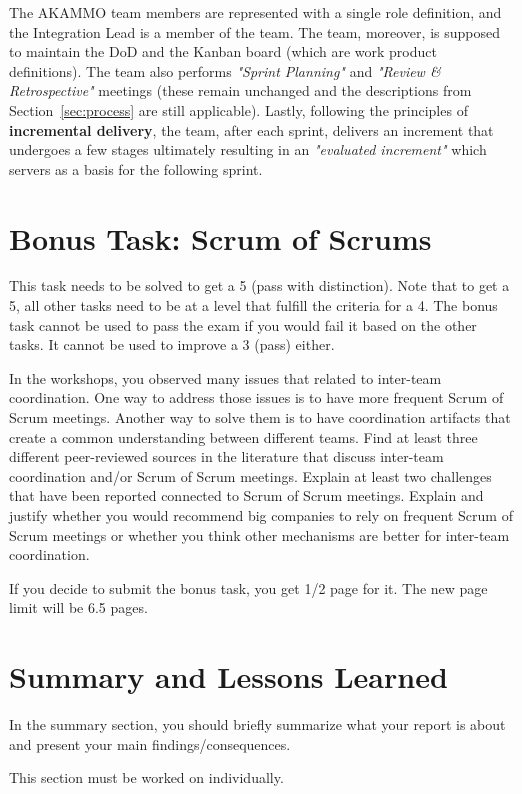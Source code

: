 \documentclass[conference]{IEEEtran}
\begin{document}
The \selectfont AKAMMO\rmfamily{} team members are represented
with a single role definition, and the Integration Lead is a member of the team. The
team, moreover, is supposed to maintain the DoD and the Kanban board (which are
work product definitions). The team also performs \textit{"Sprint Planning"} and
\textit{"Review \& Retrospective"} meetings (these remain unchanged and the
descriptions from Section~\ref{sec:process} are still applicable). Lastly,
following the principles of \textbf{incremental delivery}, the team, after each
sprint, delivers an increment that undergoes a few stages ultimately resulting
in an \textit{"evaluated increment"} which servers as a basis for the following
sprint.

\section{Bonus Task: Scrum of Scrums}
\label{sec:bonus_task}

This task needs to be solved to get a 5 (pass with distinction).
Note that to get a 5, all other tasks need to be at a level that fulfill the criteria for a 4.
The bonus task cannot be used to pass the exam if you would fail it based on the other tasks.
It cannot be used to improve a 3 (pass) either.

In the workshops, you observed many issues that related to inter-team coordination. One way to address those issues is to have more frequent Scrum of Scrum meetings. Another way to solve them is to have coordination artifacts that create a common understanding between different teams. Find at least three different peer-reviewed sources in the literature that discuss inter-team coordination and/or Scrum of Scrum meetings. Explain at least two challenges that have been reported connected to Scrum of Scrum meetings. Explain and justify whether you would recommend big companies to rely on frequent Scrum of Scrum meetings or whether you think other mechanisms are better for inter-team coordination. 

If you decide to submit the bonus task, you get 1/2 page for it. The new page limit will be 6.5 pages.

\section{Summary and Lessons Learned}
\label{sec:summary}
In the summary section, you should briefly summarize what your report is about and present your main findings/consequences.

This section must be worked on individually.



\end{document}
